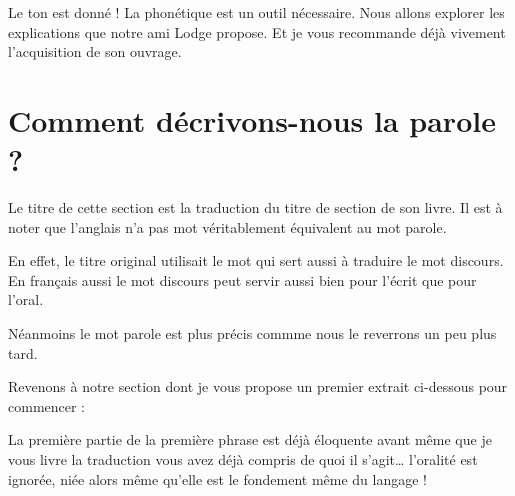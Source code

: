 Le ton est donné ! La phonétique est un outil nécessaire. Nous allons
explorer les explications que notre ami Lodge propose. Et je vous
recommande déjà vivement l'acquisition de son ouvrage.

\newpage
\minitoc
\newpage

\section{Comment décrivons-nous la parole ?}

Le titre de cette section est la traduction du titre de section de son
livre. Il est à noter que l'anglais n'a pas mot véritablement
équivalent au mot parole.

En effet, le titre original utilisait le mot  qui sert
aussi à traduire le mot discours. En français aussi le mot discours
peut servir aussi bien pour l'écrit que pour l'oral.

Néanmoins le mot parole est plus précis commme nous le reverrons un
peu plus tard.

Revenons à notre section dont je vous propose un premier extrait ci-dessous pour commencer :

\begin{center}
\begin{mdframed}[style=citestyle, frametitle={Extrait du livre \lodge}]
\end{mdframed}  
\end{center}


La première partie de la première phrase est déjà éloquente avant même
que je vous livre la traduction vous avez déjà compris de quoi il
s'agit\dots{} l'oralité est ignorée, niée alors même qu'elle est le
fondement même du langage !

